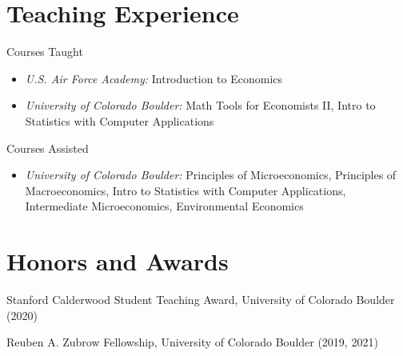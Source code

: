 \documentclass[letterpaper]{article}
\begin{document}
\section*{Teaching Experience}
  Courses Taught 
  \begin{itemize}[topsep=2pt,itemsep=-1pt,leftmargin=1em]
    \item[] \textit{U.S. Air Force Academy:} Introduction to Economics
    \item[] \textit{University of Colorado Boulder:} Math Tools for Economists II, Intro to Statistics with Computer Applications
  \end{itemize}
  \vspace*{.5em}
	Courses Assisted
	\begin{itemize}[topsep=2pt,itemsep=-1pt,leftmargin=1em]
    \item[] \textit{University of Colorado Boulder:} Principles of Microeconomics, Principles of Macroeconomics, Intro to Statistics with Computer Applications, Intermediate Microeconomics, Environmental Economics
  \end{itemize}
\section*{Honors and Awards}
	Stanford Calderwood Student Teaching Award, University of Colorado Boulder (2020)

	Reuben A. Zubrow Fellowship, University of Colorado Boulder (2019, 2021)
\end{document}
